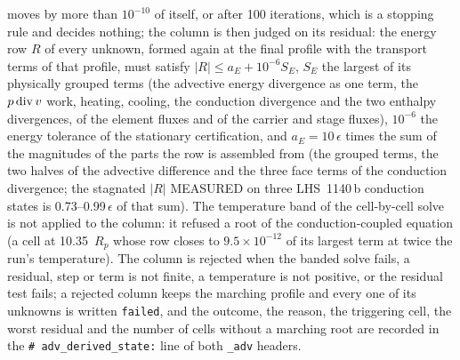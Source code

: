 moves by more than $10^{-10}$ of itself, or after 100 iterations, which is a
stopping rule and decides nothing; the column is then judged on its
residual: the energy row $R$ of every unknown, formed again at the final
profile with the transport terms of that profile, must satisfy
$|R| \le a_E + 10^{-6}S_E$, $S_E$ the largest of its physically grouped terms
(the advective energy divergence as one term, the $p\,{\rm div}\,v$ work,
heating, cooling, the conduction divergence and the two enthalpy
divergences, of the element fluxes and of the carrier and stage fluxes),
$10^{-6}$ the energy tolerance of the stationary
certification, and $a_E = 10\,\epsilon$ times the sum of the magnitudes of
the parts the row is assembled from (the grouped terms, the two halves of
the advective difference and the three face terms of the conduction
divergence; the stagnated $|R|$ MEASURED on three LHS~1140\,b conduction
states is 0.73--0.99\,$\epsilon$ of that sum).  The temperature band of the
cell-by-cell solve is not applied to the column: it refused a root of the
conduction-coupled equation (a cell at 10.35~$R_p$ whose row closes to
$9.5\times10^{-12}$ of its largest term at twice the run's temperature).
The column is rejected when the banded solve fails, a residual, step or
term is not finite, a temperature is not positive, or the residual test
fails; a rejected column keeps the marching profile and every one of its
unknowns is written \texttt{failed}, and the outcome, the reason, the
triggering cell, the worst residual and the number of cells without a
marching root are recorded in the \texttt{\# adv\_derived\_state:} line of
both \texttt{\_adv} headers.

